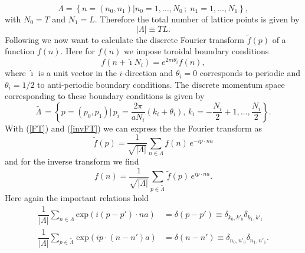 \begin{equation}
\mathit{\Lambda}=\left\lbrace  n=\left(n_{0},n_{1}\right) \vert n_{0}=1,\ldots,N_{0}\,; \; n_{1}=1,\ldots,N_{1} \right\rbrace,
\end{equation}
with $N_{0}=T$ and $N_{1}=L$. Therefore the total number of lattice points is given by
\begin{equation}
\vert \mathit{\Lambda}\vert \equiv TL.
\end{equation}
Following \cite{gattringer2009quantum} we now want to calculate the discrete Fourier transform $\tilde{f}(p)$ of a function $f(n)$. Here for $f(n)$ we impose toroidal boundary conditions
\begin{equation}
f(n+\hat{\imath}N_{i})= e ^{2\pi i \theta_{i}}f(n),
\end{equation}
where $\hat{\imath}$ is a unit vector in the $i$-direction and $\theta_{i}=0$ corresponds to periodic and $\theta_{i}=1/2$ to anti-periodic boundary conditions. The discrete momentum space corresponding to these boundary conditions is given by
\begin{equation}
\mathit{\widetilde{\Lambda\,}}= \left\lbrace p=(p_{0},p_{1}) \vert\, p_{i}=\dfrac{2\pi}{aN_{i}}(k_{i}+\theta_{i}) ,\, k_{i}=-\dfrac{N_{i}}{2}+1,\ldots,\dfrac{N_{i}}{2} \right\rbrace.
\end{equation}
With (\ref{FT}) and (\ref{invFT}) we can express the the Fourier transform as
\begin{equation}
\tilde{f}(p)=\dfrac{1}{\sqrt{\vert\mathit{\Lambda}\vert}} \sum\limits_{n\in \mathit{\Lambda}} f(n)\,  e ^{- i  p\cdot na}
\end{equation}
and for the inverse transform we find
\begin{equation}
f(n) = \dfrac{1}{\sqrt{\vert\mathit{\Lambda}\vert}} \sum\limits_{p\in \widetilde{\mathit{\Lambda}\,}} \tilde{f}(p)\,  e ^{ i p\cdot na}.
\end{equation}
Here again the important relations hold
\begin{align}
\dfrac{1}{\vert\mathit{\Lambda}\vert} \sum\limits_{n\in \mathit{\Lambda}} \text{exp}( i (p-p')\cdot na) &=\delta(p-p') \equiv \delta_{k_{0},k'_{0}}\delta_{k_{1},k'_{1}} \\
\dfrac{1}{\vert\mathit{\Lambda}\vert} \sum\limits_{p\in  \widetilde{\mathit{\Lambda}\,}} \text{exp}( i p\cdot (n-n')a) &=\delta(n-n') \equiv \delta_{n_{0},n'_{0}}\delta_{n_{1},n'_{1}}.
\end{align}
